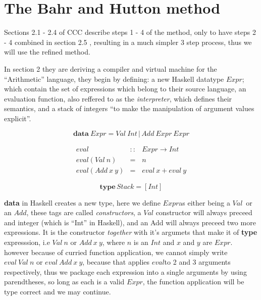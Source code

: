 \documentclass {article}
\begin{document}

\section{The Bahr and Hutton method}

Sections 2.1 - 2.4 of CCC describe steps
1 - 4 of the method, only to have steps 2 - 4 combined
in section 2.5 \cite[2.5 Combining the transformation steps]{bandh},
 resulting in a much simpler 3 step process, thus we will use the refined method.

In section 2 they are deriving a compiler
and virtual machine for the ``Arithmetic'' language,
they begin by defining: a new Haskell datatype $Expr$;
which contain the set of expressions which belong to their source language,
an evaluation function, also reffered to as the \emph{interpreter},
which defines their semantics,
and a stack of integers 
``to make the manipulation of argument values explicit''.

	\[ \textbf{data} \  Expr = Val \ Int \, | \, Add \ Expr \ Expr\]

\newcommand{\eval}{$eval$}
\newcommand{\expr}{$Expr$}
\newcommand{\val}{$Val$}
\newcommand{\add}{$Add$}
\newcommand{\code}{$Code$}

\begin{eqnarray*}
	 eval &::& Expr \rightarrow Int \\ 
	 eval (Val \  n) &=& n \\
	 eval (Add \  x \  y) &=& eval \  x + eval \  y 
\end{eqnarray*}

	\[ \textbf{type} \, Stack = [Int]\]

\textbf{data} in Haskell creates a new type,
here we define \expr as either being a \val\
or an \add, these tags are called \emph{constructors},
a $Val$ constructor will always preceed and integer
(which is ``Int'' in Haskell),
and an Add will always preceed two more expressions.
It is the constructor \emph{together} with 
it's argumets that make it of \textbf{type}
expresssion, i.e $Val \ n$ or $Add \ x \ y$,
where $n$ is an $Int$ and $x$ and $y$ are $Expr$.
however because of curried function application,
we cannot simply write 
$eval \ Val \ n$ or $eval \ Add \ x \ y$,
because that applies \eval to 2 and 3 arguments respectively,
thus we package each expression into a single arguments
by using parendtheses, so long as each is a
valid \expr, the function application will be type correct
and we may continue.
\end{document}
